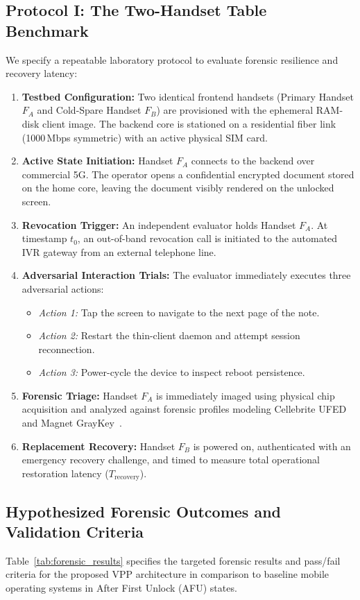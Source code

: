 \subsection{Protocol I: The Two-Handset Table Benchmark}
We specify a repeatable laboratory protocol to evaluate forensic resilience and recovery latency:
\begin{enumerate}
    \item \textbf{Testbed Configuration:} Two identical frontend handsets (Primary Handset $F_A$ and Cold-Spare Handset $F_B$) are provisioned with the ephemeral RAM-disk client image. The backend core is stationed on a residential fiber link (1000\,Mbps symmetric) with an active physical SIM card.
    \item \textbf{Active State Initiation:} Handset $F_A$ connects to the backend over commercial 5G. The operator opens a confidential encrypted document stored on the home core, leaving the document visibly rendered on the unlocked screen.
    \item \textbf{Revocation Trigger:} An independent evaluator holds Handset $F_A$. At timestamp $t_0$, an out-of-band revocation call is initiated to the automated IVR gateway from an external telephone line.
    \item \textbf{Adversarial Interaction Trials:} The evaluator immediately executes three adversarial actions:
    \begin{itemize}
        \item \textit{Action 1:} Tap the screen to navigate to the next page of the note.
        \item \textit{Action 2:} Restart the thin-client daemon and attempt session reconnection.
        \item \textit{Action 3:} Power-cycle the device to inspect reboot persistence.
    \end{itemize}
    \item \textbf{Forensic Triage:} Handset $F_A$ is immediately imaged using physical chip acquisition and analyzed against forensic profiles modeling Cellebrite UFED and Magnet GrayKey~\cite{cellebrite2023whitepaper, graykey2023architecture}.
    \item \textbf{Replacement Recovery:} Handset $F_B$ is powered on, authenticated with an emergency recovery challenge, and timed to measure total operational restoration latency ($T_{\text{recovery}}$).
\end{enumerate}

\subsection{Hypothesized Forensic Outcomes and Validation Criteria}
Table~\ref{tab:forensic_results} specifies the targeted forensic results and pass/fail criteria for the proposed VPP architecture in comparison to baseline mobile operating systems in After First Unlock (AFU) states.

